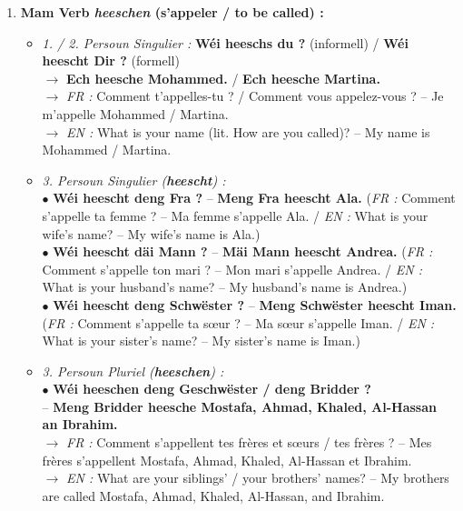 \begin{enumerate}
    \item \textbf{Mam Verb \textit{heeschen} (s'appeler / to be called) :}
    \begin{itemize}
        \item \textit{1. / 2. Persoun Singulier :} \textbf{Wéi heeschs du ?} (informell) / \textbf{Wéi heescht Dir ?} (formell) \\
        $\rightarrow$ \textbf{Ech heesche Mohammed.} / \textbf{Ech heesche Martina.} \\
        $\rightarrow$ \textit{FR :} Comment t'appelles-tu ? / Comment vous appelez-vous ? -- Je m'appelle Mohammed / Martina. \\
        $\rightarrow$ \textit{EN :} What is your name (lit. How are you called)? -- My name is Mohammed / Martina.
        \item \textit{3. Persoun Singulier (\textbf{heescht}) :} \\
        $\bullet$ \textbf{Wéi heescht deng Fra ?} -- \textbf{Meng Fra heescht Ala.} (\textit{FR :} Comment s'appelle ta femme ? -- Ma femme s'appelle Ala. / \textit{EN :} What is your wife's name? -- My wife's name is Ala.) \\
        $\bullet$ \textbf{Wéi heescht däi Mann ?} -- \textbf{Mäi Mann heescht Andrea.} (\textit{FR :} Comment s'appelle ton mari ? -- Mon mari s'appelle Andrea. / \textit{EN :} What is your husband's name? -- My husband's name is Andrea.) \\
        $\bullet$ \textbf{Wéi heescht deng Schwëster ?} -- \textbf{Meng Schwëster heescht Iman.} (\textit{FR :} Comment s'appelle ta sœur ? -- Ma sœur s'appelle Iman. / \textit{EN :} What is your sister's name? -- My sister's name is Iman.)
        \item \textit{3. Persoun Pluriel (\textbf{heeschen}) :} \\
        $\bullet$ \textbf{Wéi heeschen deng Geschwëster / deng Bridder ?} \\
        -- \textbf{Meng Bridder heesche Mostafa, Ahmad, Khaled, Al-Hassan an Ibrahim.} \\
        $\rightarrow$ \textit{FR :} Comment s'appellent tes frères et sœurs / tes frères ? -- Mes frères s'appellent Mostafa, Ahmad, Khaled, Al-Hassan et Ibrahim. \\
        $\rightarrow$ \textit{EN :} What are your siblings' / your brothers' names? -- My brothers are called Mostafa, Ahmad, Khaled, Al-Hassan, and Ibrahim.
    \end{itemize}


\end{enumerate}
